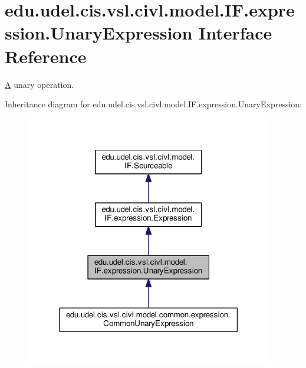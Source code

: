 \hypertarget{interfaceedu_1_1udel_1_1cis_1_1vsl_1_1civl_1_1model_1_1IF_1_1expression_1_1UnaryExpression}{}\section{edu.\+udel.\+cis.\+vsl.\+civl.\+model.\+I\+F.\+expression.\+Unary\+Expression Interface Reference}
\label{interfaceedu_1_1udel_1_1cis_1_1vsl_1_1civl_1_1model_1_1IF_1_1expression_1_1UnaryExpression}


\hyperlink{structA}{A} unary operation.  




Inheritance diagram for edu.\+udel.\+cis.\+vsl.\+civl.\+model.\+I\+F.\+expression.\+Unary\+Expression\+:
\nopagebreak
\begin{figure}[H]
\begin{center}
\leavevmode
\includegraphics[width=306pt]{interfaceedu_1_1udel_1_1cis_1_1vsl_1_1civl_1_1model_1_1IF_1_1expression_1_1UnaryExpression__inherit__graph}
\end{center}
\end{figure}


